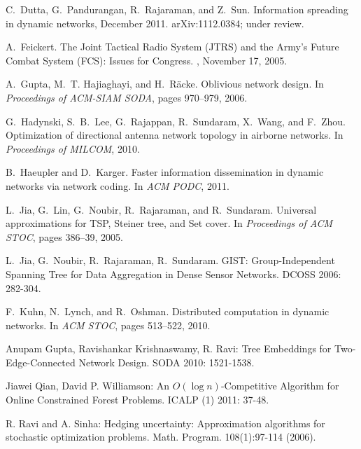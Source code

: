 \documentclass{article}
\begin{document}
{\begin{thebibliography}{99}
C.~Dutta, G.~Pandurangan, R.~Rajaraman, and Z.~Sun.
\newblock Information spreading in dynamic networks, December 2011.
\newblock arXiv:1112.0384; under review.

A.~Feickert.
\newblock The Joint Tactical Radio System (JTRS) and the Army's Future Combat System (FCS): Issues for Congress.
, November 17, 2005.

A.~Gupta, M.~T. Hajiaghayi, and H.~{R\"{a}cke}.
\newblock Oblivious network design.
\newblock In {\em Proceedings of ACM-SIAM SODA}, pages 970--979, 2006.

G.~Hadynski, S.~B.~Lee, G.~Rajappan, R.~Sundaram, X.~Wang, and F.~Zhou.
\newblock Optimization of directional antenna network topology in airborne networks.
\newblock In {\em Proceedings of MILCOM}, 2010.

B.~Haeupler and D.~Karger.
\newblock Faster information dissemination in dynamic networks via network
  coding.
\newblock In {\em ACM PODC}, 2011.

L.~Jia, G.~Lin, G.~Noubir, R.~Rajaraman, and R.~Sundaram.
\newblock Universal approximations for TSP, Steiner tree, and Set cover.
\newblock In {\em Proceedings of ACM STOC}, pages 386--39, 2005.

L.~Jia, G.~Noubir, R.~Rajaraman, R.~Sundaram.
\newblock
GIST: Group-Independent Spanning Tree for Data Aggregation in Dense Sensor Networks.
\newblock DCOSS 2006: 282-304.

F.~Kuhn, N.~Lynch, and R.~Oshman.
\newblock Distributed computation in dynamic networks.
\newblock In {\em ACM STOC}, pages 513--522, 2010.

 Anupam Gupta, Ravishankar Krishnaswamy, R. Ravi: Tree Embeddings for Two-Edge-Connected Network Design. SODA 2010: 1521-1538.

 Jiawei Qian, David P. Williamson: An $O(\log
  n)$-Competitive Algorithm for Online Constrained Forest
  Problems. ICALP (1) 2011: 37-48.

R. Ravi and A. Sinha:   Hedging uncertainty: Approximation
algorithms for stochastic optimization problems. Math. Program. 108(1):97-114 (2006).
\end{thebibliography}

}
\end{document}
